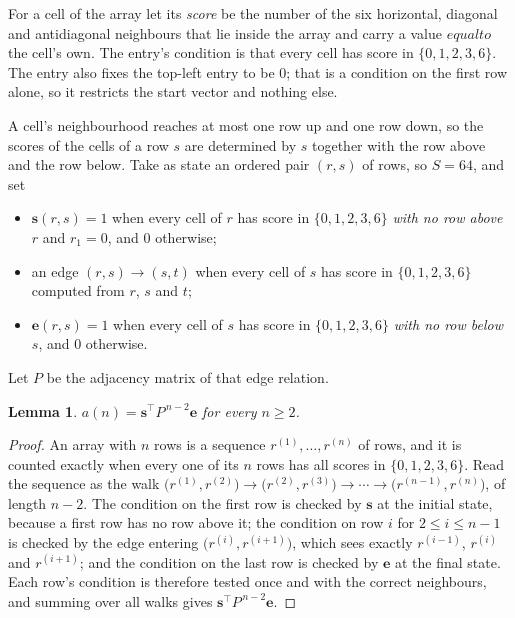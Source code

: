 \documentclass[11pt,a4paper]{article}
\theoremstyle{plain}
\newtheorem{lemma}[theorem]{Lemma}
\theoremstyle{definition}
\begin{document}
For a cell of the array let its \emph{score} be the number of the six horizontal, diagonal and antidiagonal neighbours that lie inside
the array and carry a value $equal to$ the cell's own. The entry's condition is that every cell
has score in $\{0,1,2,3,6\}$. The entry also fixes the top-left entry to be $0$; that is a condition on the first row alone, so it restricts the start vector and nothing else.

A cell's neighbourhood reaches at most one row up and one row down, so the scores of the
cells of a row $s$ are determined by $s$ together with the row above and the row below.
Take as state an ordered pair $(r,s)$ of rows, so $S=64$, and set
\begin{itemize}
\item $\mathbf{s}(r,s)=1$ when every cell of $r$ has score in $\{0,1,2,3,6\}$ \emph{with no row
above $r$} and $r_1=0$, and $0$ otherwise;
\item an edge $(r,s)\to(s,t)$ when every cell of $s$ has score in $\{0,1,2,3,6\}$ computed from
$r$, $s$ and $t$;
\item $\mathbf{e}(r,s)=1$ when every cell of $s$ has score in $\{0,1,2,3,6\}$ \emph{with no row
below $s$}, and $0$ otherwise.
\end{itemize}
Let $P$ be the adjacency matrix of that edge relation.

\begin{lemma}\label{lem:walk}
$a(n)=\mathbf{s}^{\!\top}P^{\,n-2}\mathbf{e}$ for every $n\ge2$.
\end{lemma}

\begin{proof}
An array with $n$ rows is a sequence $r^{(1)},\dots,r^{(n)}$ of rows, and it is counted
exactly when every one of its $n$ rows has all scores in $\{0,1,2,3,6\}$. Read the sequence as the
walk $\bigl(r^{(1)},r^{(2)}\bigr)\to\bigl(r^{(2)},r^{(3)}\bigr)\to\cdots\to
\bigl(r^{(n-1)},r^{(n)}\bigr)$, of length $n-2$. The condition on the first row is
checked by $\mathbf{s}$ at the initial state, because a first row has no row above it; the
condition on row $i$ for $2\le i\le n-1$ is checked by the edge entering
$\bigl(r^{(i)},r^{(i+1)}\bigr)$, which sees exactly $r^{(i-1)}$, $r^{(i)}$ and
$r^{(i+1)}$; and the condition on the last row is checked by $\mathbf{e}$ at the final
state. Each row's condition is therefore tested once and with the correct neighbours, and
summing over all walks gives $\mathbf{s}^{\!\top}P^{\,n-2}\mathbf{e}$.
\end{proof}
\end{document}
